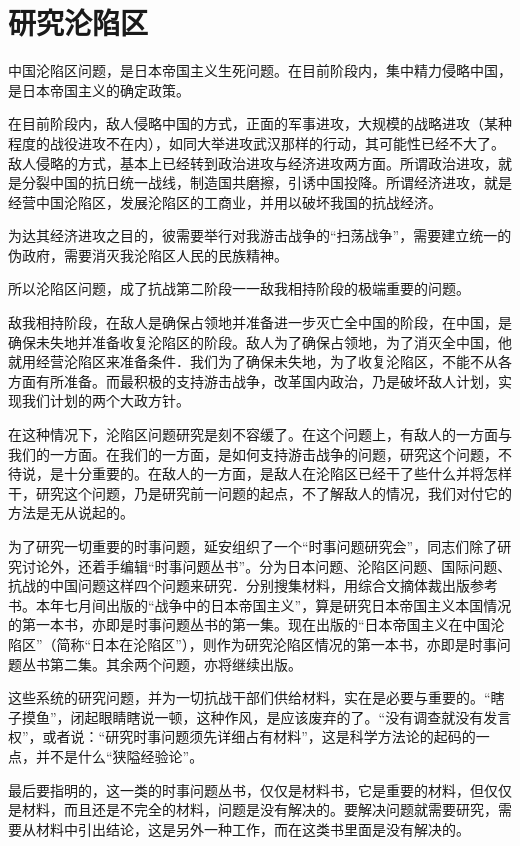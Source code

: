 \section[研究沦陷区（一九三九年十月一日）]{研究沦陷区}


中国沦陷区问题，是日本帝国主义生死问题。在目前阶段内，集中精力侵略中国，是日本帝国主义的确定政策。

在目前阶段内，敌人侵略中国的方式，正面的军事进攻，大规模的战略进攻（某种程度的战役进攻不在内），如同大举进攻武汉那样的行动，其可能性已经不大了。敌人侵略的方式，基本上已经转到政治进攻与经济进攻两方面。所谓政治进攻，就是分裂中国的抗日统一战线，制造国共磨擦，引诱中国投降。所谓经济进攻，就是经营中国沦陷区，发展沦陷区的工商业，并用以破坏我国的抗战经济。

为达其经济进攻之目的，彼需要举行对我游击战争的“扫荡战争”，需要建立统一的伪政府，需要消灭我沦陷区人民的民族精神。

所以沦陷区问题，成了抗战第二阶段一一敌我相持阶段的极端重要的问题。

敌我相持阶段，在敌人是确保占领地并准备进一步灭亡全中国的阶段，在中国，是确保未失地并准备收复沦陷区的阶段。敌人为了确保占领地，为了消灭全中国，他就用经营沦陷区来准备条件．我们为了确保未失地，为了收复沦陷区，不能不从各方面有所准备。而最积极的支持游击战争，改革国内政治，乃是破坏敌人计划，实现我们计划的两个大政方针。

在这种情况下，沦陷区问题研究是刻不容缓了。在这个问题上，有敌人的一方面与我们的一方面。在我们的一方面，是如何支持游击战争的问题，研究这个问题，不待说，是十分重要的。在敌人的一方面，是敌人在沦陷区已经干了些什么并将怎样干，研究这个问题，乃是研究前一问题的起点，不了解敌人的情况，我们对付它的方法是无从说起的。

为了研究一切重要的时事问题，延安组织了一个“时事问题研究会”，同志们除了研究讨论外，还着手编辑“时事问题丛书”。分为日本问题、沦陷区问题、国际问题、抗战的中国问题这样四个问题来研究．分别搜集材料，用综合文摘体裁出版参考书。本年七月间出版的“战争中的日本帝国主义”，算是研究日本帝国主义本国情况的第一本书，亦即是时事问题丛书的第一集。现在出版的“日本帝国主义在中国沦陷区”（简称“日本在沦陷区”），则作为研究沦陷区情况的第一本书，亦即是时事问题丛书第二集。其余两个问题，亦将继续出版。

这些系统的研究问题，并为一切抗战干部们供给材料，实在是必要与重要的。“瞎子摸鱼”，闭起眼睛瞎说一顿，这种作风，是应该废弃的了。“没有调查就没有发言权”，或者说：“研究时事问题须先详细占有材料”，这是科学方法论的起码的一点，并不是什么“狭隘经验论”。

最后要指明的，这一类的时事问题丛书，仅仅是材料书，它是重要的材料，但仅仅是材料，而且还是不完全的材料，问题是没有解决的。要解决问题就需要研究，需要从材料中引出结论，这是另外一种工作，而在这类书里面是没有解决的。

